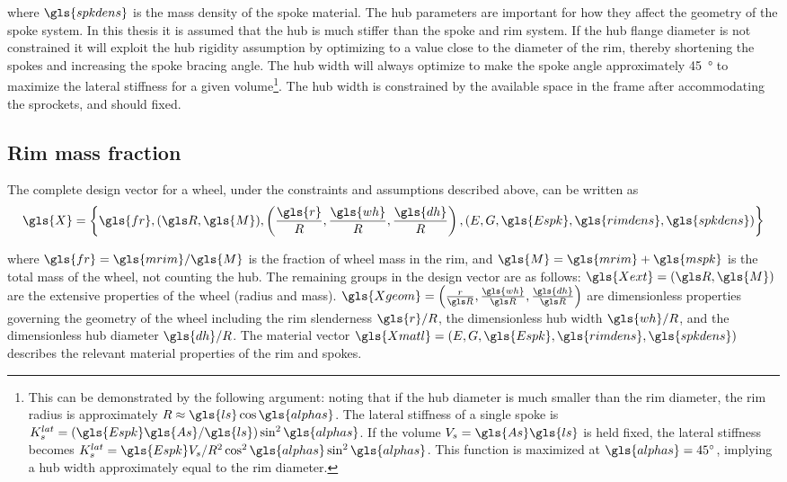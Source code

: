 \documentclass[\rootdir/thesis.tex]{subfiles}
\begin{document}
where $\gls{spkdens}$ is the mass density of the spoke material. The hub parameters are important for how they affect the geometry of the spoke system. In this thesis it is assumed that the hub is much stiffer than the spoke and rim system. If the hub flange diameter is not constrained it will exploit the hub rigidity assumption by optimizing to a value close to the diameter of the rim, thereby shortening the spokes and increasing the spoke bracing angle. The hub width will always optimize to make the spoke angle approximately \SI{45}{\degree} to maximize the lateral stiffness for a given volume\footnote{This can be demonstrated by the following argument: noting that if the hub diameter is much smaller than the rim diameter, the rim radius is approximately $R \approx \gls{ls} \cos{\gls{alphas}}$. The lateral stiffness of a single spoke is $K_s^{lat} = (\gls{Espk}\gls{As}/\gls{ls})\sin^2{\gls{alphas}}$. If the volume $V_s=\gls{As}\gls{ls}$ is held fixed, the lateral stiffness becomes $K_s^{lat} = \gls{Espk}V_s/R^2 \cos^2{\gls{alphas}}\sin^2{\gls{alphas}}$. This function is maximized at $\gls{alphas}=\SI{45}{\degree}$, implying a hub width approximately equal to the rim diameter.}. The hub width is constrained by the available space in the frame after accommodating the sprockets, and should fixed.

\subsection{Rim mass fraction}

The complete design vector for a wheel, under the constraints and assumptions described above, can be written as
\begin{equation}
\label{eqn:design_vector}
\gls{X} = \left\lbrace \gls{fr}, (\R, \gls{M}), \left(\frac{\gls{r}}{R}, \frac{\gls{wh}}{R}, \frac{\gls{dh}}{R}\right), (E, G, \gls{Espk}, \gls{rimdens}, \gls{spkdens}) \right\rbrace
\end{equation}

where $\gls{fr} = \gls{mrim}/\gls{M}$ is the fraction of wheel mass in the rim, and $\gls{M}=\gls{mrim} + \gls{mspk}$ is the total mass of the wheel, not counting the hub. The remaining groups in the design vector are as follows: $\gls{Xext}=(\R, \gls{M})$ are the extensive properties of the wheel (radius and mass). $\gls{Xgeom} = \left(\frac{r}{\R}, \frac{\gls{wh}}{\R}, \frac{\gls{dh}}{\R}\right)$ are dimensionless properties governing the geometry of the wheel including the rim slenderness $\gls{r}/R$, the dimensionless hub width $\gls{wh}/R$, and the dimensionless hub diameter $\gls{dh}/R$. The material vector $\gls{Xmatl}= (E, G, \gls{Espk}, \gls{rimdens}, \gls{spkdens})$ describes the relevant material properties of the rim and spokes.
\end{document}
